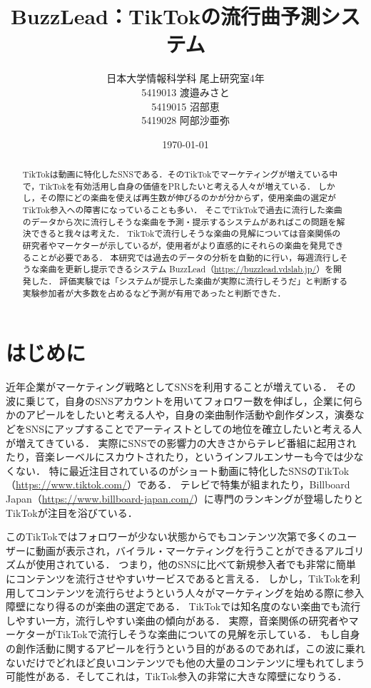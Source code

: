 \documentclass[titlepage]{jsreport}
\title{BuzzLead：TikTokの流行曲予測システム}
\author{日本大学情報科学科 尾上研究室4年\\5419013 渡邉みさと　\\5419015 沼部恵 \\ 5419028 阿部沙亜弥}
\date{\today}
\begin{document}
\maketitle

\begin{abstract}
TikTokは動画に特化したSNSである．そのTikTokでマーケティングが増えている中で，TikTokを有効活用し自身の価値をPRしたいと考える人々が増えている．
しかし，その際にどの楽曲を使えば再生数が伸びるのかが分からず，使用楽曲の選定がTikTok参入への障害になっていることも多い．
そこでTikTokで過去に流行した楽曲のデータから次に流行しそうな楽曲を予測・提示するシステムがあればこの問題を解決できると我々は考えた．
TikTokで流行しそうな楽曲の見解については音楽関係の研究者やマーケターが示しているが，使用者がより直感的にそれらの楽曲を発見できることが必要である．
本研究では過去のデータの分析を自動的に行い，毎週流行しそうな楽曲を更新し提示できるシステム BuzzLead（\url{https://buzzlead.vdslab.jp/}）を開発した．
評価実験では「システムが提示した楽曲が実際に流行しそうだ」と判断する実験参加者が大多数を占めるなど予測が有用であったと判断できた．
\end{abstract}

\chapter{はじめに}\label{chp:intro}
近年企業がマーケティング戦略としてSNSを利用することが増えている．
その波に乗じて，自身のSNSアカウントを用いてフォロワー数を伸ばし，企業に何らかのアピールをしたいと考える人や，自身の楽曲制作活動や創作ダンス，演奏などをSNSにアップすることでアーティストとしての地位を確立したいと考える人が増えてきている．
実際にSNSでの影響力の大きさからテレビ番組に起用されたり，音楽レーベルにスカウトされたり，というインフルエンサーも今では少なくない．
特に最近注目されているのがショート動画に特化したSNSのTikTok（\url{https://www.tiktok.com/}）である．
テレビで特集が組まれたり，Billboard Japan（\url{https://www.billboard-japan.com/}）に専門のランキングが登場したりとTikTokが注目を浴びている．

このTikTokではフォロワーが少ない状態からでもコンテンツ次第で多くのユーザーに動画が表示され，バイラル・マーケティングを行うことができるアルゴリズムが使用されている．
つまり，他のSNSに比べて新規参入者でも非常に簡単にコンテンツを流行させやすいサービスであると言える．
しかし，TikTokを利用してコンテンツを流行らせようという人々がマーケティングを始める際に参入障壁になり得るのが楽曲の選定である．
TikTokでは知名度のない楽曲でも流行しやすい一方，流行しやすい楽曲の傾向がある．
実際，音楽関係の研究者やマーケターがTikTokで流行しそうな楽曲についての見解を示している．
もし自身の創作活動に関するアピールを行うという目的があるのであれば，この波に乗れないだけでどれほど良いコンテンツでも他の大量のコンテンツに埋もれてしまう可能性がある．そしてこれは，TikTok参入の非常に大きな障壁になりうる．
\end{document}
